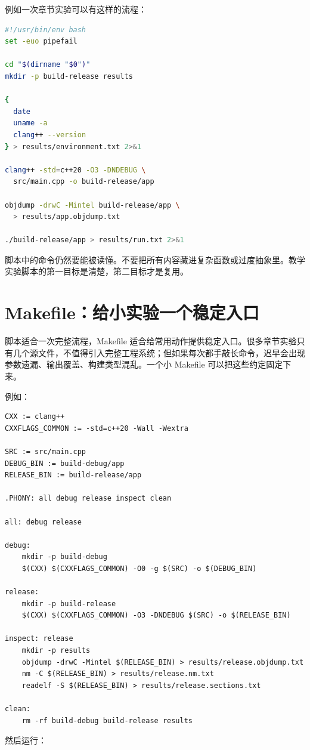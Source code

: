 例如一次章节实验可以有这样的流程：

\begin{lstlisting}[language=bash]
#!/usr/bin/env bash
set -euo pipefail

cd "$(dirname "$0")"
mkdir -p build-release results

{
  date
  uname -a
  clang++ --version
} > results/environment.txt 2>&1

clang++ -std=c++20 -O3 -DNDEBUG \
  src/main.cpp -o build-release/app

objdump -drwC -Mintel build-release/app \
  > results/app.objdump.txt

./build-release/app > results/run.txt 2>&1
\end{lstlisting}

脚本中的命令仍然要能被读懂。不要把所有内容藏进复杂函数或过度抽象里。教学实验脚本的第一目标是清楚，第二目标才是复用。

\section{Makefile：给小实验一个稳定入口}

脚本适合一次完整流程，Makefile 适合给常用动作提供稳定入口。很多章节实验只有几个源文件，不值得引入完整工程系统；但如果每次都手敲长命令，迟早会出现参数遗漏、输出覆盖、构建类型混乱。一个小 Makefile 可以把这些约定固定下来。

例如：

\begin{lstlisting}
CXX := clang++
CXXFLAGS_COMMON := -std=c++20 -Wall -Wextra

SRC := src/main.cpp
DEBUG_BIN := build-debug/app
RELEASE_BIN := build-release/app

.PHONY: all debug release inspect clean

all: debug release

debug:
	mkdir -p build-debug
	$(CXX) $(CXXFLAGS_COMMON) -O0 -g $(SRC) -o $(DEBUG_BIN)

release:
	mkdir -p build-release
	$(CXX) $(CXXFLAGS_COMMON) -O3 -DNDEBUG $(SRC) -o $(RELEASE_BIN)

inspect: release
	mkdir -p results
	objdump -drwC -Mintel $(RELEASE_BIN) > results/release.objdump.txt
	nm -C $(RELEASE_BIN) > results/release.nm.txt
	readelf -S $(RELEASE_BIN) > results/release.sections.txt

clean:
	rm -rf build-debug build-release results
\end{lstlisting}

然后运行：

